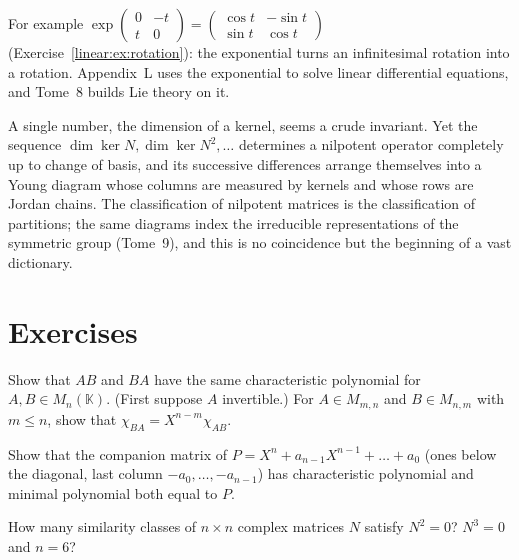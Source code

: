 For example $\exp\begin{pmatrix}0&-t\\t&0\end{pmatrix}=\begin{pmatrix}\cos t&-\sin t\\\sin t&\cos t\end{pmatrix}$
(Exercise~\ref{linear:ex:rotation}): the exponential turns an infinitesimal rotation into a rotation. Appendix~L uses the
exponential to solve linear differential equations, and Tome~8 builds Lie theory on it.

\begin{beauty}
A single number, the dimension of a kernel, seems a crude invariant. Yet the sequence $\dim\ker N,\dim\ker N^2,\dots$
determines a nilpotent operator completely up to change of basis, and its successive differences arrange themselves into a
Young diagram whose columns are measured by kernels and whose rows are Jordan chains. The classification of nilpotent
matrices is the classification of partitions; the same diagrams index the irreducible representations of the symmetric
group (Tome~9), and this is no coincidence but the beginning of a vast dictionary.
\end{beauty}

\section{Exercises}

\begin{exercise}[$\star$]\label{linear:ex:abba}
Show that $AB$ and $BA$ have the same characteristic polynomial for $A,B\in M_n(\mathbb K)$. (First suppose $A$ invertible.)
For $A\in M_{m,n}$ and $B\in M_{n,m}$ with $m\le n$, show that $\chi_{BA}=X^{n-m}\chi_{AB}$.
\end{exercise}

\begin{exercise}[$\star$]\label{linear:ex:companion}
Show that the companion matrix of $P=X^n+a_{n-1}X^{n-1}+\dots+a_0$ (ones below the diagonal, last column
$-a_0,\dots,-a_{n-1}$) has characteristic polynomial and minimal polynomial both equal to $P$.
\end{exercise}

\begin{exercise}[$\star$]\label{linear:ex:nilcount}
How many similarity classes of $n\times n$ complex matrices $N$ satisfy $N^2=0$? $N^3=0$ and $n=6$?
\end{exercise}

